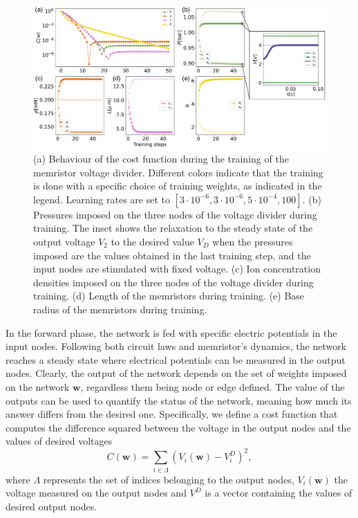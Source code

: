 \documentclass[reprint,superscriptaddress,prb,showkeys]{revtex4-2}
\newcommand{\brac}[1]{\left(#1 \right)} %
\begin{document}
\begin{figure}[t]
    \centering
    \includegraphics[width=1.7\columnwidth]{plots/voltage_divider/mse_weights_vd.pdf}
    \caption{(a) Behaviour of the cost function during the training of the memristor voltage divider. Different colors indicate that the training is done with a specific choice of training weights, as indicated in the legend. Learning rates are set to $[3\cdot 10^{-6}, 3\cdot 10^{-6}, 5\cdot 10^{-4}, 100]$. (b) Pressures imposed on the three nodes of the voltage divider during training. The inset shows the relaxation to the steady state of the output voltage $V_2$ to the desired value $V_D$ when the pressures imposed are the values obtained in the last training step, and the input nodes are stimulated with fixed voltage. (c) Ion concentration densities imposed on the three nodes of the voltage divider during training. (d) Length of the memristors during training. (e) Base radius of the memristors during training.}\label{fig:mse_weights_vd}
\end{figure} 
In the forward phase, the network is fed with specific electric potentials in the input nodes. Following both circuit laws and memristor's dynamics, the network reaches a steady state where electrical potentials can be measured in the output nodes. Clearly, the output of the network depends on the set of weights imposed on the network $\boldsymbol{w}$, regardless them being node or edge defined. The value of the outputs can be used to quantify the status of the network, meaning how much its answer differs from the desired one. Specifically, we define a cost function that computes the difference squared between the voltage in the output nodes and the values of desired voltages
\[
C\left( \boldsymbol{w} \right) = \sum_{i \in \Lambda} \brac{V_i\brac{\boldsymbol{w}} - V_i^D}^2,
\label{eq:cost_func}
\]
where $\Lambda$ represents the set of indices belonging to the output nodes, $V_i\brac{\boldsymbol{w}}$ the voltage measured on the output nodes and $V^D$ is a vector containing the values of desired output nodes.
\end{document}
